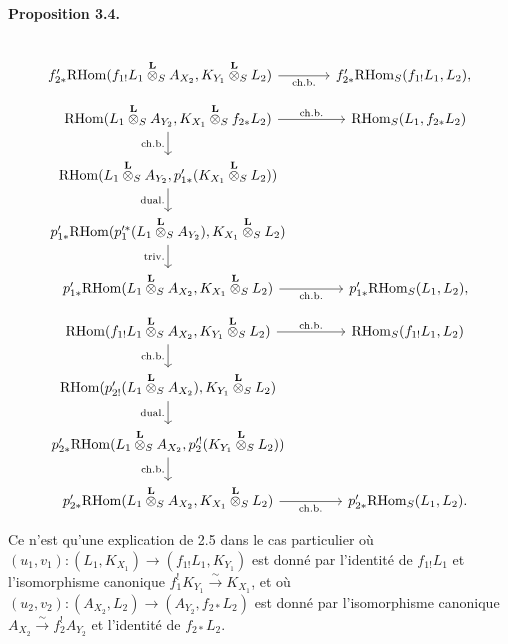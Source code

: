 \documentclass[11pt]{article}
\newenvironment{statement}[1]{\par\medskip\noindent\textbf{#1.}\ }{\par\medskip}
\providecommand{\RHom}{\mathrm{RHom}}
\providecommand{\RHom}{\mathrm{RHom}}
\providecommand{\RHom}{\mathrm R\mathcal{H}om}
\providecommand{\RHom}{\mathrm{RHom}}
\begin{document}
\begin{statement}{Proposition 3.4}
\[\begin{tikzcd}[column sep=3.7em,row sep=1.7em]
& \\
f'_{2*}\RHom(f_{1!}L_1\overset{\mathbf L}{\otimes}_S A_{X_2},K_{Y_1}\overset{\mathbf L}{\otimes}_S L_2) \arrow[r,"\mathrm{ch.b.}"']
& f'_{2*}\RHom_S(f_{1!}L_1,L_2),
\end{tikzcd}
\]
\[
\begin{tikzcd}[column sep=3.7em,row sep=1.7em]
\RHom(L_1\overset{\mathbf L}{\otimes}_S A_{Y_2},K_{X_1}\overset{\mathbf L}{\otimes}_S f_{2*}L_2)
  \arrow[r,"\mathrm{ch.b.}"] \arrow[d,"\mathrm{ch.b.}"']
& \RHom_S(L_1,f_{2*}L_2)  \\
\RHom(L_1\overset{\mathbf L}{\otimes}_S A_{Y_2},p'_{1*}(K_{X_1}\overset{\mathbf L}{\otimes}_S L_2)) \arrow[d,"\mathrm{dual.}"']
& \\
p'_{1*}\RHom(p_1'^*(L_1\overset{\mathbf L}{\otimes}_S A_{Y_2}),K_{X_1}\overset{\mathbf L}{\otimes}_S L_2) \arrow[d,"\mathrm{triv.}"']
& \\
p'_{1*}\RHom(L_1\overset{\mathbf L}{\otimes}_S A_{X_2},K_{X_1}\overset{\mathbf L}{\otimes}_S L_2) \arrow[r,"\mathrm{ch.b.}"']
& p'_{1*}\RHom_S(L_1,L_2),
\end{tikzcd}
\]
\[
\begin{tikzcd}[column sep=3.7em,row sep=1.7em]
\RHom(f_{1!}L_1\overset{\mathbf L}{\otimes}_S A_{X_2},K_{Y_1}\overset{\mathbf L}{\otimes}_S L_2)
  \arrow[r,"\mathrm{ch.b.}"] \arrow[d,"\mathrm{ch.b.}"']
& \RHom_S(f_{1!}L_1,L_2)  \\
\RHom(p'_{2!}(L_1\overset{\mathbf L}{\otimes}_S A_{X_2}),K_{Y_1}\overset{\mathbf L}{\otimes}_S L_2) \arrow[d,"\mathrm{dual.}"']
& \\
p'_{2*}\RHom(L_1\overset{\mathbf L}{\otimes}_S A_{X_2},p_2'^!(K_{Y_1}\overset{\mathbf L}{\otimes}_S L_2)) \arrow[d,"\mathrm{ch.b.}"']
& \\
p'_{2*}\RHom(L_1\overset{\mathbf L}{\otimes}_S A_{X_2},K_{X_1}\overset{\mathbf L}{\otimes}_S L_2) \arrow[r,"\mathrm{ch.b.}"']
& p'_{2*}\RHom_S(L_1,L_2).
\end{tikzcd}
\]
\end{statement}
Ce n'est qu'une explication de 2.5 dans le cas particulier où $(u_1,v_1):(L_1,K_{X_1})\to(f_{1!}L_1,K_{Y_1})$ est donné par l'identité de $f_{1!}L_1$ et l'isomorphisme canonique $f_1^!K_{Y_1}\xrightarrow{\sim}K_{X_1}$, et où $(u_2,v_2):(A_{X_2},L_2)\to(A_{Y_2},f_{2*}L_2)$ est donné par l'isomorphisme canonique $A_{X_2}\xrightarrow{\sim}f_2^!A_{Y_2}$ et l'identité de $f_{2*}L_2$.
\end{document}
